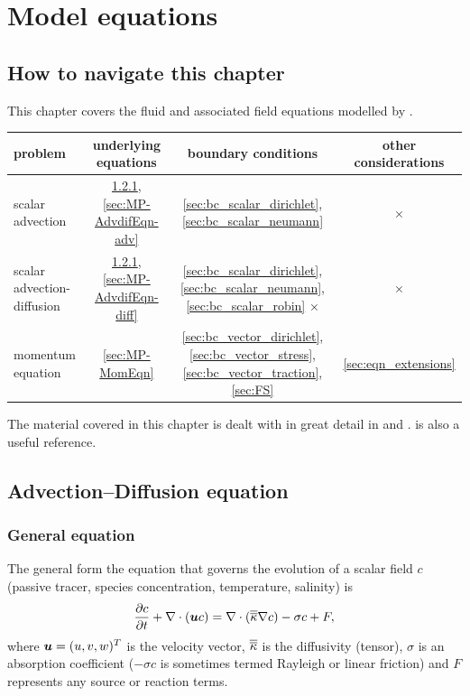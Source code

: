 \chapter{Model equations}\label{chap:model_equations}

\section{How to navigate this chapter}

This chapter covers the fluid and associated field equations modelled by {\fluidity}.

\begin{center}
\begin{tabular}{lccc}
\hline
problem & underlying equations & boundary conditions & other considerations\\
\hline
scalar advection & \ref{sec:MP-AdvdifEqn-eqns}, \ref{sec:MP-AdvdifEqn-adv} & \ref{sec:bc_scalar_dirichlet}, \ref{sec:bc_scalar_neumann} & × \\
scalar advection-diffusion & \ref{sec:MP-AdvdifEqn-eqns}, \ref{sec:MP-AdvdifEqn-diff} & \ref{sec:bc_scalar_dirichlet}, \ref{sec:bc_scalar_neumann}, \ref{sec:bc_scalar_robin} × & ×\\
momentum equation & \ref{sec:MP-MomEqn} & \ref{sec:bc_vector_dirichlet}, \ref{sec:bc_vector_stress}, \ref{sec:bc_vector_traction}, \ref{sec:FS} & \ref{sec:eqn_extensions} \\
\hline
\end{tabular}
\end{center}

The material covered in this chapter is dealt with in great detail in \citet{batchelor1967} and \citet{landau}. \cite{cushman1994} is also a useful reference.

\section{Advection--Diffusion equation}\label{sec:MP-AdvdifEqn}

\subsection{General equation}\label{sec:MP-AdvdifEqn-eqns}

The general form the equation that governs the evolution of a scalar field $c$
(\eg passive tracer, species concentration, temperature, salinity) is
\begin{equation}\label{eq:general_scalar_eqn}
\frac{\partial c}{\partial t} + \nabla\cdot({\mbox{\boldmath$u$}} c) = \nabla\cdot(\overline{\overline{\kappa}}\nabla c) - \sigma c + F,
\end{equation}
where ${\mbox{\boldmath$u$}}=(u,v,w)^{T}$ is the velocity vector, $\overline{\overline{\kappa}}$ is the diffusivity (tensor), $\sigma$ is an absorption coefficient ($-\sigma c$ is sometimes termed Rayleigh or linear friction) and $F$ represents any source or reaction terms.

